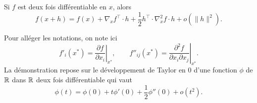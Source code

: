 \begin{proposition} \label{prop:taylorOrdre2}
  Si $f$ est deux fois différentiable en $x$, alors
  $$
  f(x+h) = f(x) + \nabla_x f^\top \cdot h + \frac12 h^\top \cdot \nabla^2_x f \cdot h + o(\|h\|^2).
  $$
\end{proposition}

  Pour alléger les notations, on note ici
  $$
  f'_i(x^*) = \left. \frac{\partial f}{\partial x_i}\right|_{x^*}, \qquad 
  f''_{ij}(x^*) = \left. \frac{\partial^2 f}{\partial x_i \partial x_j}\right|_{x^*}.
  $$
  La démonstration repose sur le développement de Taylor en 0 d'une fonction $\phi$ de $\mathbb{R}$ dans $\mathbb{R}$ deux fois différentiable qui vaut
  \begin{equation} \label{eq:taylor2phi}
  \phi(t) = \phi(0) + t \phi'(0) + \frac12 \phi''(0) + o(t^2).
  \end{equation}

